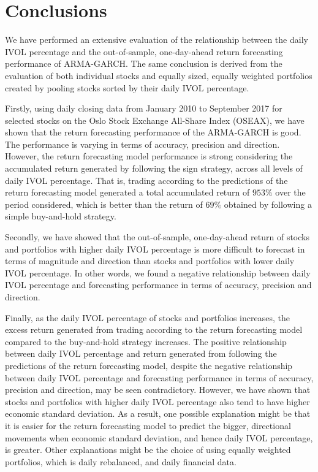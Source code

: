 
\chapter{Conclusions}
\label{Conclusions}

We have performed an extensive evaluation of the relationship between the daily IVOL percentage and the out-of-sample, one-day-ahead return forecasting performance of ARMA-GARCH. The same conclusion is derived from the evaluation of both individual stocks and equally sized, equally weighted portfolios created by pooling stocks sorted by their daily IVOL percentage. 

Firstly, using daily closing data from January 2010 to September 2017 for selected stocks on the Oslo Stock Exchange All-Share Index (OSEAX), we have shown that the return forecasting performance of the ARMA-GARCH is good. The performance is varying in terms of accuracy, precision and direction. However, the return forecasting model performance is strong considering the accumulated return generated by following the sign strategy, across all levels of daily IVOL percentage. That is, trading according to the predictions of the return forecasting model generated a total accumulated return of $953\%$ over the period considered, which is better than the return of $69\%$ obtained by following a simple buy-and-hold strategy.

Secondly, we have showed that the out-of-sample, one-day-ahead return of stocks and portfolios with higher daily IVOL percentage is more difficult to forecast in terms of magnitude and direction than stocks and portfolios with lower daily IVOL percentage. In other words, we found a negative relationship between daily IVOL percentage and forecasting performance in terms of accuracy, precision and direction.

Finally, as the  daily IVOL percentage of stocks and portfolios increases, the excess return generated from trading according to the return forecasting model compared to the buy-and-hold strategy increases. The positive relationship between daily IVOL percentage and return generated from following the predictions of the return forecasting model, despite the negative relationship between daily IVOL percentage and forecasting performance in terms of accuracy, precision and direction, may be seen contradictory. However, we have shown that stocks and portfolios with higher daily IVOL percentage also tend to have higher economic standard deviation. As a result, one possible explanation might be that it is easier for the return forecasting model to predict the bigger, directional movements when economic standard deviation, and hence daily IVOL percentage, is greater. Other explanations might be the choice of using equally weighted portfolios, which is daily rebalanced, and daily financial data.